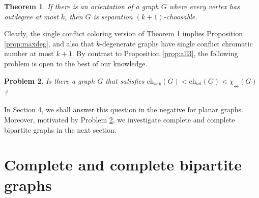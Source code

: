 \documentclass[12pt]{article}
\newtheorem{theorem}{Theorem}[section]
\newtheorem{problem}[theorem]{Problem}
\newcommand{\single}{\chi_{\nleftrightarrow}}
\newcommand{\ch}{\mathrm{ch}}
\begin{document}
\begin{theorem} \cite{KratochvilTuzaVoigt}
\label{th:orient}
	If there is an orientation of a graph $G$ where every vertex has outdegree
	at most $k$, then $G$ is separation $(k+1)$-choosable.
\end{theorem}


Clearly, the single conflict coloring version of Theorem \ref{th:orient} implies Proposition \ref{prop:maxdeg}, and
also that $k$-degenerate graphs have single conflict chromatic number at most $k+1$.
By contrast to Proposition \ref{prop:all3}, the following problem is open to the best of our knowledge.

\begin{problem}
\label{prob:alldiff}
	 Is there a graph $G$ that satisfies
	$\ch_{sep}(G) < \ch_{ad}(G) < \single(G)$?
\end{problem}
	
In Section 4, we shall answer this 
question in the negative for planar graphs.
Moreover, motivated by Problem \ref{prob:alldiff},
we investigate complete and complete bipartite graphs in the 
next section. 
	
\section{Complete and complete bipartite graphs}
\end{document}
